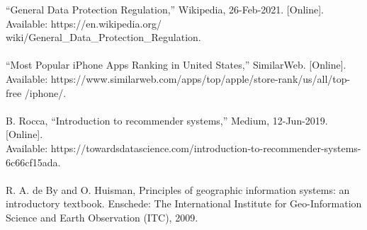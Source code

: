 \documentclass{ucsdreport}
\begin{document}
\newpage

“General Data Protection Regulation,” Wikipedia, 26-Feb-2021. [Online]. 
Available: https://en.wikipedia.org/\\
wiki/General\_Data\_Protection\_Regulation. 
\\
\\
“Most Popular iPhone Apps Ranking in United States,” SimilarWeb. 
[Online].\\ 
Available: https://www.similarweb.com/apps/top/apple/store-rank/us/all/top-free
/iphone/. 
\\
\\
B. Rocca, “Introduction to recommender systems,” Medium, 12-Jun-2019. 
[Online]. \\Available: https://towardsdatascience.com/introduction-to-recommender-systems-6c66cf15ada. 
\\
\\
R. A. de By and O. Huisman, Principles of geographic information systems: an introductory textbook. Enschede: The International Institute for Geo-Information Science and Earth Observation (ITC), 2009.



\end{document}
